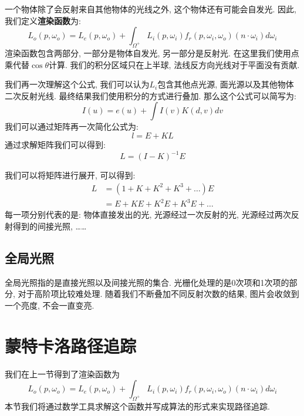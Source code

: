 一个物体除了会反射来自其他物体的光线之外, 这个物体还有可能会自发光. 因此, 我们定义\textbf{渲染函数}为: 
\begin{equation}
	L_o(p,\omega_o)=L_e(p,\omega_o)+\int_{\Omega^+}L_i(p,\omega_i)f_r(p,\omega_i,\omega_o)(n\cdot \omega_i)d\omega_i
\end{equation}渲染函数包含两部分, 一部分是物体自发光, 另一部分是反射光. 在这里我们使用点乘代替$\cos\theta$计算. 我们的积分区域只在上半球, 法线反方向光线对于平面没有贡献. 

我们再一次理解这个公式, 我们可以认为$L_i$包含其他点光源, 面光源以及其他物体二次反射光线. 最终结果我们使用积分的方式进行叠加. 那么这个公式可以简写为: 
\begin{equation}
	I(u)=e(u)+\int I(v)K(d,v)dv
\end{equation} 我们可以通过矩阵再一次简化公式为: 
\begin{equation}
	l=E+KL
\end{equation}
通过求解矩阵我们可以得到: 
\begin{equation}
	L=(I-K)^{-1}E
\end{equation}

我们可以将矩阵进行展开, 可以得到: 
\begin{equation}
	\begin{split}
		L&=(1+K+K^2+K^3+\dots)E\\
		&=E+KE+K^2E+K^3E+\dots
	\end{split}
\end{equation}
每一项分别代表的是: 物体直接发出的光, 光源经过一次反射的光, 光源经过两次反射得到的间接光照, ……

\section{全局光照}
全局光照指的是直接光照以及间接光照的集合. 光栅化处理的是0次项和1次项的部分, 对于高阶项比较难处理. 随着我们不断叠加不同反射次数的结果, 图片会收敛到一个亮度, 不会一直变亮.

\chapter{蒙特卡洛路径追踪}

我们在上一节得到了渲染函数为
\begin{equation}
	L_o(p,\omega_o)=L_e(p,\omega_o)+\int_{\Omega^+}L_i(p,\omega_i)f_r(p,\omega_i,\omega_o)(n\cdot \omega_i)d\omega_i
\end{equation}
本节我们将通过数学工具求解这个函数并写成算法的形式来实现路径追踪. 

